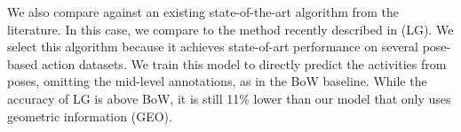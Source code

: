 We also compare against an existing state-of-the-art algorithm from
the literature. In this case, we compare to the
method recently described in \cite{vemulapalli2014human} (LG).
We select this algorithm because it achieves state-of-art
performance on several pose-based action datasets. We train this model to
directly predict the activities from poses, omitting the mid-level
annotations, as in the BoW baseline. While the accuracy of LG is above BoW, it is
still 11\% lower than our model that only uses geometric information (GEO).

%
%
